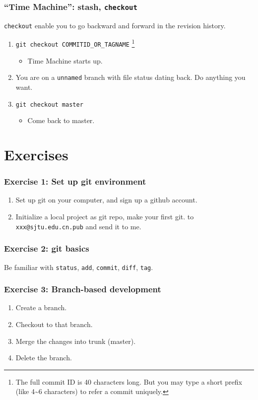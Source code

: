 \documentclass[11pt,ignorenonframetext,]{beamer}
\begin{document}
\begin{frame}[fragile]\frametitle{``Time Machine'': stash,
\texttt{checkout}}

\texttt{checkout} enable you to go backward and forward in the revision
history.

\begin{enumerate}[1.]
\item
  \texttt{git checkout COMMITID\_OR\_TAGNAME} \footnote{The full commit
    ID is 40 characters long. But you may type a short prefix (like
    4\textasciitilde{}6 characters) to refer a commit uniquely.}
  \begin{itemize}
  \item
    Time Machine starts up.
  \end{itemize}
\item
  You are on a \texttt{unnamed} branch with file status dating back. Do
  anything you want.
\item
  \texttt{git checkout master}
  \begin{itemize}
  \item
    Come back to master.
  \end{itemize}
\end{enumerate}
\end{frame}

\section{Exercises}

\begin{frame}[fragile]\frametitle{Exercise 1: Set up git environment}

\begin{enumerate}[1.]
\item
  Set up git on your computer, and sign up a github account.
\item
  Initialize a local project as git repo, make your first git.
  to \texttt{xxx@sjtu.edu.cn.pub} and send it to me.
\end{enumerate}
\end{frame}

\begin{frame}[fragile]\frametitle{Exercise 2: git basics}

Be familiar with \texttt{status}, \texttt{add}, \texttt{commit},
\texttt{diff}, \texttt{tag}.

\end{frame}

\begin{frame}\frametitle{Exercise 3: Branch-based development}

\begin{enumerate}[1.]
\item
  Create a branch.
\item
  Checkout to that branch.
\item
  Merge the changes into trunk (master).
\item
  Delete the branch.
\end{enumerate}
\end{frame}
\end{document}
